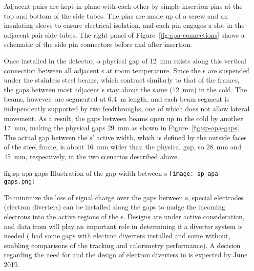 Adjacent  pairs %
are kept in plane with each other by simple insertion pins at the top and bottom of the side tubes.  The pins are made up of a screw and an insulating sleeve to ensure electrical isolation, and each pin engages a slot in the adjacent  pair %
side tubes. The right panel of Figure~\ref{fig:apa-connections} shows a schematic of the side pin connectors before and after insertion.  

Once installed in the detector, a physical gap of \SI{12}{mm} exists along this vertical connection between all adjacent s at room temperature. Since the s are suspended under the stainless steel  beams, which contract similarly to that of the  frames, the gaps between most adjacent s stay about the same (\SI{12}{mm}) in the cold.  The  beams, however, are segmented at \SI{6.4}{m} length, and each beam segment is independently supported by two  feedthroughs, one of which does not allow lateral movement.  As a result, the gaps between  beams open up in the cold by another \SI{17}{mm},  %
making the physical gaps \SI{29}{mm} as shown in Figure~\ref{fig:sp-apa-gaps}.  The actual gap between the s' active width, which is defined by the outside faces of the steel frame, is about \SI{16}{mm} wider than the physical gap, so \SI{28}{mm} and \SI{45}{mm}, respectively, in the two scenarios described above.

\begin{dunefigure}{fig:sp-apa-gaps}
{Illustration of the gap width between s}  
\texttt{[image: sp-apa-gaps.png]} 
\end{dunefigure}


To minimize the loss of signal charge over the gaps between s, special electrodes (electron diverters) can be installed along the gaps to nudge the incoming electrons into the active regions of the s.  Designs are under active consideration, and data from  will play an important role in determining if a diverter system is needed ( had some  gaps with electron diverters installed and some without, enabling comparisons of the tracking and calorimetry performance).  A decision regarding the need for and the design of electron diverters in  is expected by June 2019.

